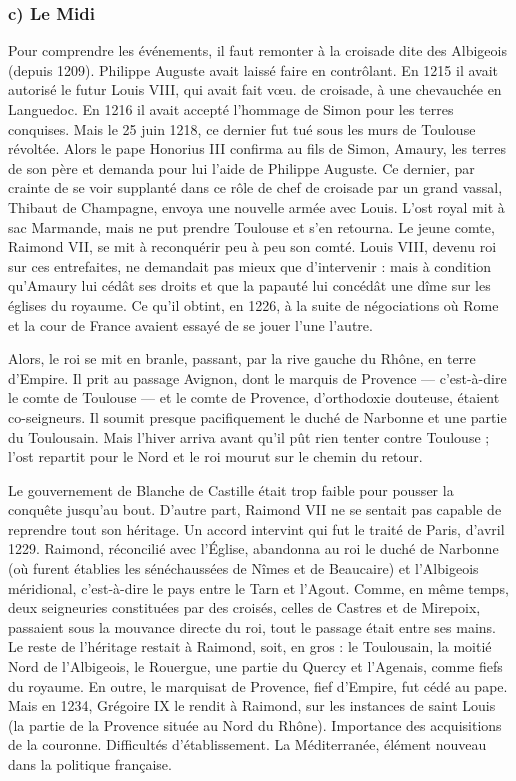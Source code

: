 \documentclass[french,twoside]{book} %
\begin{document}
\subsubsection[c) Le Midi]{c) Le Midi}
\noindent Pour comprendre les événements, il faut remonter à la croisade dite des Albigeois (depuis 1209). Philippe Auguste avait laissé faire en contrôlant. En 1215 il avait autorisé le futur Louis VIII, qui avait fait vœu. de croisade, à une chevauchée en Languedoc. En 1216 il avait accepté l’hommage de Simon pour les terres conquises. Mais le 25 juin 1218, ce dernier fut tué sous les murs de Toulouse révoltée. Alors le pape Honorius III confirma au fils de Simon, Amaury, les terres de son père et demanda pour lui l’aide de Philippe Auguste. Ce dernier, par crainte de se voir supplanté dans ce rôle de chef de croisade par un grand vassal, Thibaut de Champagne, envoya une nouvelle armée avec Louis. L’ost royal mit à sac Marmande, mais ne put prendre Toulouse et s’en retourna. Le jeune comte, Raimond VII, se mit à reconquérir peu à peu son comté. Louis VIII, devenu roi sur ces entrefaites, ne demandait pas mieux que d’intervenir : mais à condition qu’Amaury lui cédât ses droits et que la papauté lui concédât une dîme sur les églises du royaume. Ce qu’il obtint, en 1226, à la suite de négociations où Rome et la cour de France avaient essayé de se jouer l’une l’autre.\par
Alors, le roi se mit en branle, passant, par la rive gauche du Rhône, en terre d’Empire. Il prit au passage Avignon, dont le marquis de Provence — c’est-à-dire le comte de Toulouse — et le comte de Provence, d’orthodoxie douteuse, étaient co-seigneurs. Il soumit presque pacifiquement le duché de Narbonne et une partie du Toulousain. Mais l’hiver arriva avant qu’il pût rien tenter contre Toulouse ; l’ost repartit pour le Nord et le roi mourut sur le chemin du retour.\par
Le gouvernement de Blanche de Castille était trop faible pour pousser la conquête jusqu’au bout. D’autre part, Raimond VII ne se sentait pas capable de reprendre tout son héritage. Un accord intervint qui fut le traité de Paris, d’avril 1229. Raimond, réconcilié avec l’Église, abandonna au roi le duché de Narbonne (où furent établies les sénéchaussées de Nîmes et de Beaucaire) et l’Albigeois méridional, c’est-à-dire le pays entre le Tarn et l’Agout. Comme, en  
\label{p27} même temps, deux seigneuries constituées par des croisés, celles de Castres et de Mirepoix, passaient sous la mouvance directe du roi, tout le passage était entre ses mains. Le reste de l’héritage restait à Raimond, soit, en gros : le Toulousain, la moitié Nord de l’Albigeois, le Rouergue, une partie du Quercy et l’Agenais, comme fiefs du royaume. En outre, le marquisat de Provence, fief d’Empire, fut cédé au pape. Mais en 1234, Grégoire IX le rendit à Raimond, sur les instances de saint Louis (la partie de la Provence située au Nord du Rhône). Importance des acquisitions de la couronne. Difficultés d’établissement. La Méditerranée, élément nouveau dans la politique française.\par
\end{document}
